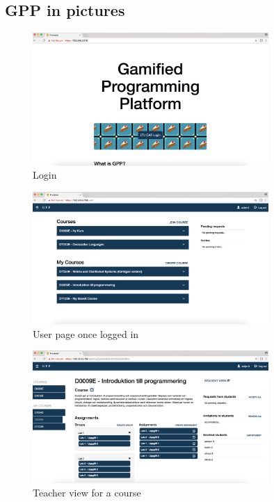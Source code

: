 \subsection{GPP in pictures}

\begin{figure}[H]
\centering
\includegraphics[width=0.8\textwidth]{img/gppinpictures/login.png}
\caption{Login}
\label{fig:login}
\end{figure}

\begin{figure}[H]
\centering
\includegraphics[width=0.8\textwidth]{img/gppinpictures/user.png}
\caption{User page once logged in}
\label{fig:user}
\end{figure}

\begin{figure}[H]
\centering
\includegraphics[width=0.8\textwidth]{img/gppinpictures/teacher.png}
\caption{Teacher view for a course}
\label{fig:teacher}
\end{figure}

